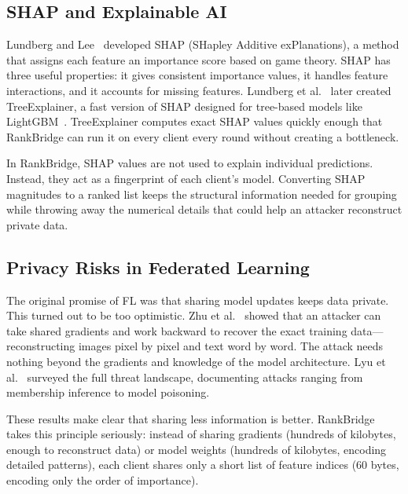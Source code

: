 \documentclass[information,article,submit,pdftex]{mdpi}
\begin{document}
\subsection{SHAP and Explainable AI}

Lundberg and Lee~\cite{lundberg2017shap} developed SHAP (SHapley Additive
exPlanations), a method that assigns each feature an importance score based on
game theory. SHAP has three useful properties: it gives consistent importance
values, it handles feature interactions, and it accounts for missing features.
Lundberg et al.~\cite{lundberg2020treeshap} later created TreeExplainer, a fast
version of SHAP designed for tree-based models like LightGBM~\cite{ke2017lightgbm}.
TreeExplainer computes exact SHAP values quickly enough that RankBridge can run
it on every client every round without creating a bottleneck.

In RankBridge, SHAP values are not used to explain individual predictions.
Instead, they act as a fingerprint of each client's model. Converting SHAP
magnitudes to a ranked list keeps the structural information needed for grouping
while throwing away the numerical details that could help an attacker reconstruct
private data.

\subsection{Privacy Risks in Federated Learning}

The original promise of FL was that sharing model updates keeps data private.
This turned out to be too optimistic. Zhu et al.~\cite{zhu2019deepleakage} showed
that an attacker can take shared gradients and work backward to recover the exact
training data---reconstructing images pixel by pixel and text word by word. The
attack needs nothing beyond the gradients and knowledge of the model architecture.
Lyu et al.~\cite{lyu2020threats} surveyed the full threat landscape, documenting
attacks ranging from membership inference to model poisoning.

These results make clear that sharing less information is better. RankBridge takes
this principle seriously: instead of sharing gradients (hundreds of kilobytes,
enough to reconstruct data) or model weights (hundreds of kilobytes, encoding
detailed patterns), each client shares only a short list of feature indices
(60 bytes, encoding only the order of importance).

\end{document}
